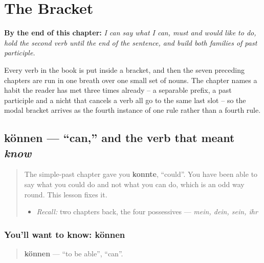 
\chapter{The Bracket}
\label{ch:ge-klammer}

\begin{chapteropening}
\textbf{By the end of this chapter:} \emph{I can say what I can, must and would like to do, hold the second verb until the end of the sentence, and build both families of past participle.}

Every verb in the book is put inside a bracket, and then the seven preceding chapters are run in one breath over one small set of nouns. The chapter names a habit the reader has met three times already -- a separable prefix, a past participle and a nicht that cancels a verb all go to the same last slot -- so the modal bracket arrives as the fourth instance of one rule rather than a fourth rule.
\end{chapteropening}

\section[können]{können — \textquotedblleft{}can,\textquotedblright{} and the verb that meant \emph{know}}

\label{lesson:GE-C38-koennen}



\begin{quote}
The simple-past chapter gave you \textbf{konnte}, \textquotedblleft{}could\textquotedblright{}. You have been able to say what you could do and not what you can do, which is an odd way round. This lesson fixes it.

\begin{itemize}
\raggedright
  \item \emph{Recall:} two chapters back, the four possessives — \emph{mein, dein, sein, ihr}
\end{itemize}
\end{quote}

\subsection*{You'll want to know: können}
\begin{quote}
\textbf{können} — \textquotedblleft{}to be able\textquotedblright{}, \textquotedblleft{}can\textquotedblright{}.
\end{quote}

